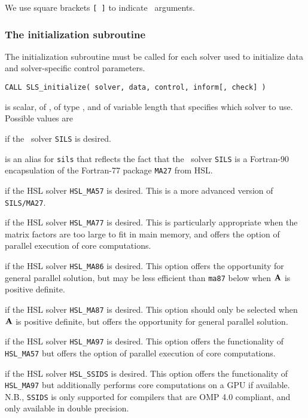 \documentclass{galahad}
\newcommand{\packagename}{SLS}
\begin{document}

\galarguments
We use square brackets {\tt [ ]} to indicate \optional\ arguments.


\subsubsection{The initialization subroutine}\label{subinit}
The initialization subroutine must be called for each solver used
to initialize data and solver-specific control parameters.

\hskip0.5in
{\tt CALL \packagename\_initialize( solver, data, control, inform[, check] )}
\begin{description}

 is scalar, of \intentin, of type \character, and of variable
length that specifies which solver to use. Possible values are
\begin{description}
 if the \galahad\ solver {\tt SILS} is desired.

 is an alias for {\tt sils} that reflects the fact that the \galahad\
 solver {\tt SILS} is a Fortran-90 encapsulation of the Fortran-77
 package {\tt MA27} from HSL.

 if the HSL solver {\tt HSL\_MA57} is desired. This is a more
advanced version of {\tt SILS/MA27}.

 if the HSL solver {\tt HSL\_MA77} is desired. This is particularly
appropriate when the matrix factors are too large to fit in main memory,
and offers the option of parallel execution of core computations.

 if the HSL solver {\tt HSL\_MA86} is desired. This option
offers the opportunity for general parallel solution, but may be
less efficient than {\tt ma87} below when ${\mathbf{A}}$ is positive definite.

 if the HSL solver {\tt HSL\_MA87} is desired. This option should
only be selected when ${\mathbf{A}}$ is positive definite, but
offers the opportunity for general parallel solution.

 if the HSL solver {\tt HSL\_MA97} is desired. This option offers
the functionality of {\tt HSL\_MA57} but offers the option of parallel
execution of core computations.

 if the HSL solver {\tt HSL\_SSIDS} is desired. This option offers
the functionality of {\tt HSL\_MA97} but additionally performs
core computations on a GPU if available. N.B., {\tt SSIDS} is only
supported for compilers that are OMP 4.0 compliant, and only available
in double precision.


\end{description}
\end{description}
\end{document}
